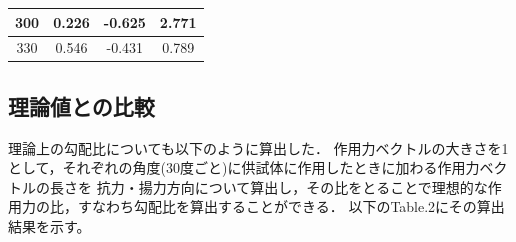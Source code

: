 \documentclass[twocolumn,a4j]{jsarticle}
\begin{document}
\begin{table}[htbp]
\begin{center}
\begin{tabular}{|p{20mm}|p{20mm}|p{20mm}|p{20mm}|}
            \multicolumn{1}{|c|}{300}                  & \multicolumn{1}{|c|}{0.226}            & \multicolumn{1}{|c|}{-0.625}           & \multicolumn{1}{|c|}{2.771}            \\ \hline
            \multicolumn{1}{|c|}{330}                  & \multicolumn{1}{|c|}{0.546}            & \multicolumn{1}{|c|}{-0.431}           & \multicolumn{1}{|c|}{0.789}            \\ \hline
        \end{tabular}
    \end{center}
\end{table}

\newpage

\subsection{理論値との比較}

理論上の勾配比についても以下のように算出した．
作用力ベクトルの大きさを1として，それぞれの角度(30度ごと)に供試体に作用したときに加わる作用力ベクトルの長さを
抗力・揚力方向について算出し，その比をとることで理想的な作用力の比，すなわち勾配比を算出することができる．
以下のTable.2にその算出結果を示す。\par
\end{document}
